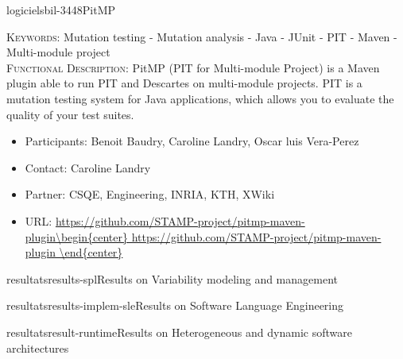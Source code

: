 \documentclass{ra2018}
\begin{document}
\begin{module}{logiciels}{bil-3448}{PitMP}
	
	\textsc{Keywords:} Mutation testing - Mutation analysis - Java - JUnit - PIT - Maven - Multi-module project \\ 
	
	\textsc{Functional Description:}  PitMP (PIT for Multi-module Project) is a Maven plugin able to run PIT and Descartes on multi-module projects. PIT is a mutation testing system for Java applications, which allows you to evaluate the quality of your test suites.\\
	
	\begin{itemize}
		\item Participants: Benoit Baudry, Caroline Landry, Oscar luis Vera-Perez
		\item Contact: Caroline Landry
		\item Partner: CSQE, Engineering, INRIA, KTH, XWiki
		\item URL: \url{https://github.com/STAMP-project/pitmp-maven-plugin\begin{center}
				https://github.com/STAMP-project/pitmp-maven-plugin
		\end{center}}
	\end{itemize}
	
\end{module}



\begin{module}{resultats}{results-spl}{Results on Variability modeling and management}
	\label{sec:results-spl}
	
\end{module}

\begin{module}{resultats}{results-implem-sle}{Results on Software Language
		Engineering}
	\label{sec:results-sle}
	
\end{module}

\begin{module}{resultats}{result-runtime}{Results on Heterogeneous and dynamic software architectures}
	\label{sec:results-runtime}
	
\end{module}
\end{document}
